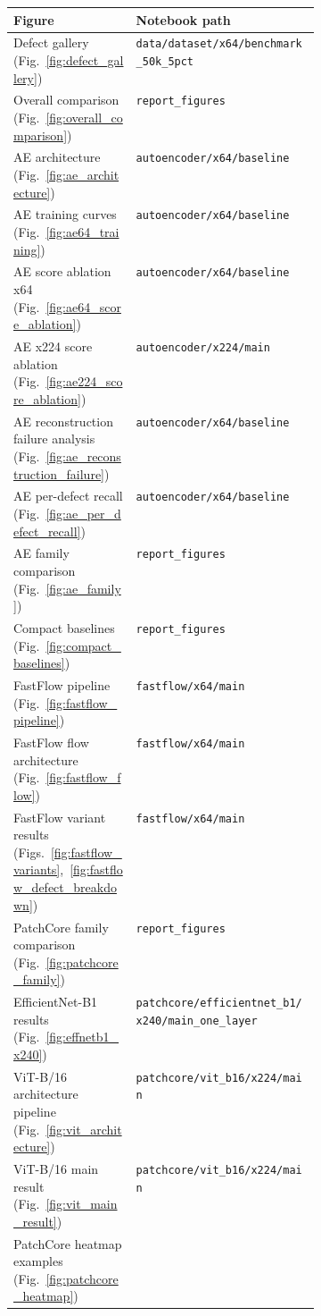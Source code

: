 \documentclass[11pt]{article}
\begin{document}
\begin{tabularx}{\linewidth}{>{\raggedright\arraybackslash}p{0.40\linewidth}>{\raggedright\arraybackslash}X}
\toprule
Figure & Notebook path \\
\midrule
Defect gallery (Fig.~\ref{fig:defect_gallery})
  & \texttt{data/dataset/x64/benchmark\_50k\_5pct} \\
Overall comparison (Fig.~\ref{fig:overall_comparison})
  & \texttt{report\_figures} \\
AE architecture (Fig.~\ref{fig:ae_architecture})
  & \texttt{autoencoder/x64/baseline} \\
AE training curves (Fig.~\ref{fig:ae64_training})
  & \texttt{autoencoder/x64/baseline} \\
AE score ablation x64 (Fig.~\ref{fig:ae64_score_ablation})
  & \texttt{autoencoder/x64/baseline} \\
AE x224 score ablation (Fig.~\ref{fig:ae224_score_ablation})
  & \texttt{autoencoder/x224/main} \\
AE reconstruction failure analysis (Fig.~\ref{fig:ae_reconstruction_failure})
  & \texttt{autoencoder/x64/baseline} \\
AE per-defect recall (Fig.~\ref{fig:ae_per_defect_recall})
  & \texttt{autoencoder/x64/baseline} \\
AE family comparison (Fig.~\ref{fig:ae_family})
  & \texttt{report\_figures} \\
Compact baselines (Fig.~\ref{fig:compact_baselines})
  & \texttt{report\_figures} \\
FastFlow pipeline (Fig.~\ref{fig:fastflow_pipeline})
  & \texttt{fastflow/x64/main} \\
FastFlow flow architecture (Fig.~\ref{fig:fastflow_flow})
  & \texttt{fastflow/x64/main} \\
FastFlow variant results (Figs.~\ref{fig:fastflow_variants},~\ref{fig:fastflow_defect_breakdown})
  & \texttt{fastflow/x64/main} \\
PatchCore family comparison (Fig.~\ref{fig:patchcore_family})
  & \texttt{report\_figures} \\
EfficientNet-B1 results (Fig.~\ref{fig:effnetb1_x240})
  & \texttt{patchcore/efficientnet\_b1/x240/main\_one\_layer} \\
ViT-B/16 architecture pipeline (Fig.~\ref{fig:vit_architecture})
  & \texttt{patchcore/vit\_b16/x224/main} \\
ViT-B/16 main result (Fig.~\ref{fig:vit_main_result})
  & \texttt{patchcore/vit\_b16/x224/main} \\
PatchCore heatmap examples (Fig.~\ref{fig:patchcore_heatmap})

\end{tabularx}
\end{document}
